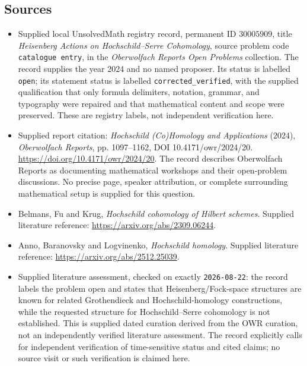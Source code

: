 \documentclass[11pt]{article}
\begin{document}
\subsection{Sources}
\begin{itemize}
\item Supplied local UnsolvedMath registry record, permanent ID \(30005909\), title \emph{Heisenberg Actions on Hochschild--Serre Cohomology}, source problem code \texttt{catalogue entry}, in the \emph{Oberwolfach Reports Open Problems} collection. The record supplies the year 2024 and no named proposer. Its status is labelled \texttt{open}; its statement status is labelled \texttt{corrected\_verified}, with the supplied qualification that only formula delimiters, notation, grammar, and typography were repaired and that mathematical content and scope were preserved. These are registry labels, not independent verification here.
\item Supplied report citation: \emph{Hochschild (Co)Homology and Applications} (2024), \emph{Oberwolfach Reports}, pp. 1097--1162, DOI 10.4171/owr/2024/20. \url{https://doi.org/10.4171/owr/2024/20}. The record describes Oberwolfach Reports as documenting mathematical workshops and their open-problem discussions. No precise page, speaker attribution, or complete surrounding mathematical setup is supplied for this question.
\item Belmans, Fu and Krug, \emph{Hochschild cohomology of Hilbert schemes}. Supplied literature reference: \url{https://arxiv.org/abs/2309.06244}.
\item Anno, Baranovsky and Logvinenko, \emph{Hochschild homology}. Supplied literature reference: \url{https://arxiv.org/abs/2512.25039}.
\item Supplied literature assessment, checked on exactly \texttt{2026-08-22}: the record labels the problem open and states that Heisenberg/Fock-space structures are known for related Grothendieck and Hochschild-homology constructions, while the requested structure for Hochschild--Serre cohomology is not established. This is supplied dated curation derived from the OWR curation, not an independently verified literature assessment. The record explicitly calls for independent verification of time-sensitive status and cited claims; no source visit or such verification is claimed here.
\end{itemize}
\end{document}
